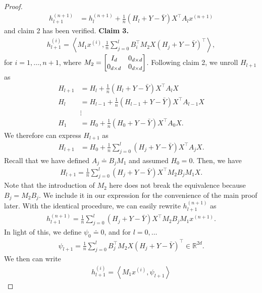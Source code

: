 \documentclass{article}
\newcommand{\R}{\mathbb{R}}
\newcommand{\indot}[2]{{\left<#1, #2\right>}}
\begin{document}
\begin{proof}
\begin{align}
        h_{l+1}^{(n+1)} &= h_l^{(n+1)} + \frac{1}{n} (H_l + Y - \bar{Y}) X^\top A_l x^{(n+1)}
    \end{align}
    and claim 2 has been verified.
    \textbf{Claim 3.}
    \begin{align}
      h_{l+1}^{(i)} = \indot{M_1 x^{(i)}}{\frac{1}{n}\sum_{j=0}^l B_i^\top M_2 X (H_j + Y - \bar{Y})^\top},
    \end{align}
    for $i = 1, \dots, n+1$, where $M_2 = \mqty[I_{d} & 0_{d\times d}\\ 0_{d\times d} & 0_{d\times d}]$.
    Following claim 2, we unroll $H_{l+1}$ as
    \begin{align}
        H_{l+1} &= H_l + \frac{1}{n} (H_l + Y - \bar{Y}) X^\top A_l X\\
        H_l &= H_{l-1} + \frac{1}{n} (H_{l-1} + Y - \bar{Y}) X^\top A_{l-1} X\\
        &\vdots\\
        H_1 &= H_0 + \frac{1}{n} (H_0 + Y - \bar{Y}) X^\top A_0 X.
    \end{align}
    We therefore can express $H_{l+1}$ as
    \begin{align}
        H_{l+1} &= H_0 + \frac{1}{n}\sum_{j=0}^l (H_j + Y - \bar{Y})X^\top A_j X.
    \end{align}
    Recall that we have defined $A_j \doteq B_j M_1$ and assumed $H_0 = 0$.
    Then, we have
    \begin{align}
        H_{l+1} = \frac{1}{n} \sum_{j=0}^l (H_j + Y - \bar{Y})X^\top M_2 B_j M_1 X.
    \end{align}
    Note that the introduction of $M_2$ here does not break the equivalence because $B_j = M_2 B_j$.
    We include it in our expression for the convenience of the main proof later.
    With the identical procedure, we can easily rewrite $h_{l+1}^{(n+1)}$ as
    \begin{align}
        h_{l+1}^{(n+1)}
        = \frac{1}{n} \sum_{j=0}^l (H_j + Y - \bar{Y})X^\top M_2 B_j M_1 x^{(n+1)}.
    \end{align}
    In light of this, we define $\psi_0 \doteq 0$, and for $l = 0, \dots$
    \begin{align}
        \psi_{l+1} = \frac{1}{n} \sum_{j=0}^l B_j^\top M_2 X (H_j + Y - \bar{Y})^\top \in \R^{2d}.
    \end{align}
    We then can write
    \begin{align}
        h_{l+1}^{(i)} = \indot{M_1 x^{(i)}}{\psi_{l+1}} \label{eq: h inner prod}
    \end{align}

\end{proof}
\end{document}
